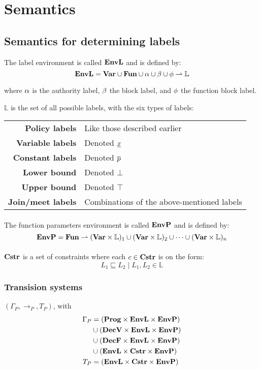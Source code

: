 \section{Semantics}

\subsection{Semantics for determining labels}
The label environment is called $\mathbf{EnvL}$ and is defined by:
\[
  \mathbf{EnvL} = \mathbf{Var} \cup \mathbf{Fun} \cup \alpha \cup \beta \cup \phi \rightharpoonup \mathbb{L}
\]

\noindent where $\alpha$ is the authority label, $\beta$ the block label, and $\phi$ the function block label.

\noindent $\mathbb{L}$ is the set of all possible labels, with the six types of labels: \\

\begin{tabular}{rl}
  \textbf{Policy labels}    & Like those described earlier \\
  \textbf{Variable labels}  & Denoted $\underline{x}$ \\
  \textbf{Constant labels}  & Denoted $\overline{p}$ \\
  \textbf{Lower bound}      & Denoted $\bot$ \\
  \textbf{Upper bound}      & Denoted $\top$ \\
  \textbf{Join/meet labels} & Combinations of the above-mentioned labels
\end{tabular}

\paragraph{}\noindent
The function parameters environment is called $\mathbf{EnvP}$ and is defined by:
\[
  \mathbf{EnvP} = \mathbf{Fun} \rightharpoonup (\mathbf{Var} \times \mathbb{L})_1 \cup (\mathbf{Var} \times \mathbb{L})_2 \cup \dots \cup (\mathbf{Var} \times \mathbb{L})_n
\]

\paragraph{}\noindent
$\mathbf{Cstr}$ is a set of constraints where each $c \in \mathbf{Cstr}$ is on the form:
\[ L_1 \sqsubseteq L_2 \; | \; L_1, L_2 \in \mathbb{L} \]


\subsubsection{Transision systems}
$(\Gamma_P, \rightarrow_P, T_P)$, with
\begin{align*}
  \Gamma_P  & = (\mathbf{Prog} \times \mathbf{EnvL} \times \mathbf{EnvP}) \\
            & \cup (\mathbf{DecV} \times \mathbf{EnvL} \times \mathbf{EnvP}) \\
            & \cup (\mathbf{DecF} \times \mathbf{EnvL} \times \mathbf{EnvP}) \\
            & \cup (\mathbf{EnvL} \times \mathbf{Cstr} \times \mathbf{EnvP}) \\
  T_P       & = (\mathbf{EnvL} \times \mathbf{Cstr} \times \mathbf{EnvP})
\end{align*}

